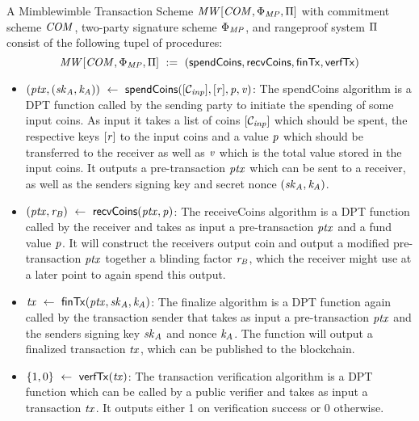 \begin{definition}
    \label{def:mw-tx-scheme}
    A Mimblewimble Transaction Scheme $\mathit{MW}[\mathit{COM},\Phi_{\mathit{MP}},\Pi]$ with commitment scheme $\mathit{COM}$, two-party signature scheme $\Phi_{\mathit{MP}}$, and rangeproof system $\Pi$ consist of the following tupel of procedures:
    \[ \mathit{MW}[\mathit{COM},\Phi_{\mathit{MP}},\Pi] ~:=~ ( \mathsf{spendCoins},\mathsf{recvCoins},\mathsf{finTx},\mathsf{verfTx} ) \]
    \begin{itemize}
        \item $(\mathit{ptx}, (\mathit{sk}_{\mathit{A}}, \mathit{\mathit{k}_{\mathit{A}}})) ~\leftarrow~ \mathsf{spendCoins}([\mathcal{C}_{\mathit{inp}}],[\mathit{r}],\mathit{p},\mathit{v})$: The spendCoins algorithm is a DPT function called by the sending party to
        initiate the spending of some input coins. As input it takes a list of coins $[\mathcal{C}_{\mathit{inp}}]$ which should be spent, the respective keys $[\mathit{r}]$ to the input coins and a value $\mathit{p}$ which should be
        transferred to the receiver as well as $\mathit{v}$ which is the total value stored in the input coins. It outputs a pre-transaction $\mathit{ptx}$ which can be sent to a receiver, as well as the senders signing key and secret nonce $(\mathit{sk}_{\mathit{A}}, \mathit{\mathit{k}_{\mathit{A}}})$.
        \item $(\mathit{ptx}, \mathit{r}_{\mathit{B}}) ~\leftarrow~ \mathsf{recvCoins}(\mathit{ptx},\mathit{p})$: The receiveCoins algorithm is a DPT function called by the receiver and takes as input a pre-transaction $\mathit{ptx}$ and a fund value
        $\mathit{p}$. It will construct the receivers output coin and output a modified pre-transaction $\mathit{ptx}$ together a blinding factor $\mathit{r}_{\mathit{B}}$, which the receiver might use at a later point to again spend this output.
        \item $\mathit{tx} ~\leftarrow~ \mathsf{finTx}(\mathit{ptx},\mathit{sk}_{\mathit{A}},\mathit{\mathit{k}_{\mathit{A}}})$: The finalize algorithm is a DPT function again called by the transaction sender that takes as input a pre-transaction $\mathit{ptx}$ and the senders
        signing key $\mathit{sk}_{\mathit{A}}$ and nonce $\mathit{\mathit{k}_{\mathit{A}}}$. The function will output a finalized transaction $\mathit{tx}$, which can be published to the blockchain.
        \item $\{1,0\} ~\leftarrow~ \mathsf{verfTx}(\mathit{tx})$: The transaction verification algorithm is a DPT function which can be called by a public verifier and takes as input a transaction $\mathit{tx}$. It
        outputs either 1 on verification success or 0 otherwise.
    \end{itemize}
\end{definition}


